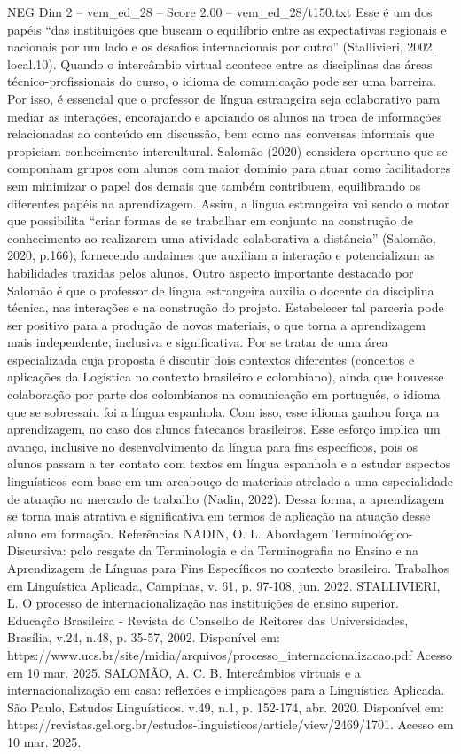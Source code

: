\begin{textsample}{NEG Dim 2 – vem\_ed\_28 – Score 2.00 – vem\_ed\_28/t150.txt}
Esse é um dos papéis “das instituições que buscam o equilíbrio entre as expectativas regionais e nacionais por um lado e os desafios internacionais por outro” (Stallivieri, 2002, local.10).
Quando o intercâmbio virtual acontece entre as disciplinas das áreas técnico-profissionais do curso, o idioma de comunicação pode ser uma barreira.
Por isso, é essencial que o professor de língua estrangeira seja colaborativo para mediar as interações, encorajando e apoiando os alunos na troca de informações relacionadas ao conteúdo em discussão, bem como nas conversas informais que propiciam conhecimento intercultural.
Salomão (2020) considera oportuno que se componham grupos com alunos com maior domínio para atuar como facilitadores sem minimizar o papel dos demais que também contribuem, equilibrando os diferentes papéis na aprendizagem.
Assim, a língua estrangeira vai sendo o motor que possibilita “criar formas de se trabalhar em conjunto na construção de conhecimento ao realizarem uma atividade colaborativa a distância” (Salomão, 2020, p.166), fornecendo andaimes que auxiliam a interação e potencializam as habilidades trazidas pelos alunos.
Outro aspecto importante destacado por Salomão é que o professor de língua estrangeira auxilia o docente da disciplina técnica, nas interações e na construção do projeto.
Estabelecer tal parceria pode ser positivo para a produção de novos materiais, o que torna a aprendizagem mais independente, inclusiva e significativa.
Por se tratar de uma área especializada cuja proposta é discutir dois contextos diferentes (conceitos e aplicações da Logística no contexto brasileiro e colombiano), ainda que houvesse colaboração por parte dos colombianos na comunicação em português, o idioma que se sobressaiu foi a língua espanhola.
Com isso, esse idioma ganhou força na aprendizagem, no caso dos alunos fatecanos brasileiros.
Esse esforço implica um avanço, inclusive no desenvolvimento da língua para fins específicos, pois os alunos passam a ter contato com textos em língua espanhola e a estudar aspectos linguísticos com base em um arcabouço de materiais atrelado a uma especialidade de atuação no mercado de trabalho (Nadin, 2022).
Dessa forma, a aprendizagem se torna mais atrativa e significativa em termos de aplicação na atuação desse aluno em formação.
Referências NADIN, O.
L.
Abordagem Terminológico-Discursiva: pelo resgate da Terminologia e da Terminografia no Ensino e na Aprendizagem de Línguas para Fins Específicos no contexto brasileiro.
Trabalhos em Linguística Aplicada, Campinas, v. 61, p. 97-108, jun. 2022.
STALLIVIERI, L.
O processo de internacionalização nas instituições de ensino superior.
Educação Brasileira - Revista do Conselho de Reitores das Universidades, Brasília, v.24, n.48, p. 35-57, 2002.
Disponível em: https://www.ucs.br/site/midia/arquivos/processo\_internacionalizacao.pdf Acesso em 10 mar. 2025.
SALOMÃO, A.
C.
B.
Intercâmbios virtuais e a internacionalização em casa: reflexões e implicações para a Linguística Aplicada.
São Paulo, Estudos Linguísticos. v.49, n.1, p. 152-174, abr. 2020.
Disponível em: https://revistas.gel.org.br/estudos-linguisticos/article/view/2469/1701.
Acesso em 10 mar. 2025.

\end{textsample}
